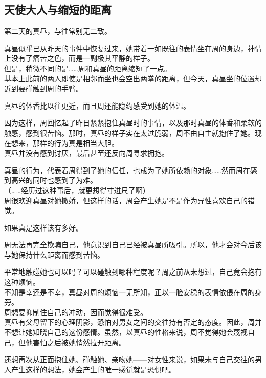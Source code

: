\subsection{天使大人与缩短的距离}

第二天的真昼，与往常别无二致。

真昼似乎已从昨天的事件中恢复过来，她带着一如既往的表情坐在周的身边，神情上没有了痛苦之色，而是一副极其平静的样子。\\

但是，稍微不同的是……周和真昼的距离缩短了一点。\\

基本上此前的两人即使是相邻而坐也会空出两拳的距离，但今天，真昼坐的位置却近到要碰触到周的手臂。

真昼的体香比以往更近，而且周还能隐约感受到她的体温。

因为这样，周回忆起了昨日紧紧抱住真昼时的事情，以及那时真昼的体香和柔软的触感，感到很苦恼。那时，真昼的样子实在太过脆弱，周不由自主就抱住了她。现在想来，那样的行为真是相当大胆。\\

真昼并没有感到讨厌，最后甚至还反向周寻求拥抱。

真昼的行为，代表着周得到了她的信任，也成为了她所依赖的对象……然而周在感到高兴的同时也感到了为难。\\

（……经历过这种事后，就更想得寸进尺了啊）\\

周很欢迎真昼对她撒娇，但这样的话，周会产生她是不是作为异性喜欢自己的错觉。

如果真是这样该有多好。

周无法再完全欺骗自己，他意识到自己已经被真昼所吸引。所以，他才会对今后该与她保持什么距离而感到苦恼。

平常地触碰她也可以吗？可以碰触到哪种程度呢？周之前从未想过，自己竟会抱有这种烦恼。\\

不知是幸还是不幸，真昼对周的烦恼一无所知，正以一脸安稳的表情依偎在周的身旁。\\

周想要抑制住自己的冲动，因而觉得很难受。\\

真昼有父母留下的心理阴影，恐怕对男女之间的交往持有否定的态度。因此，周并不想让她知晓自己的这份感情。虽然，以真昼的性格来说，周不觉得她会蔑视自己，但他害怕之后被她悄然拉开距离。

还想再次从正面抱住她、碰触她、亲吻她——对女性来说，如果未与自己交往的男人产生这样的想法，她会产生的唯一感觉就是恐惧吧。\\

